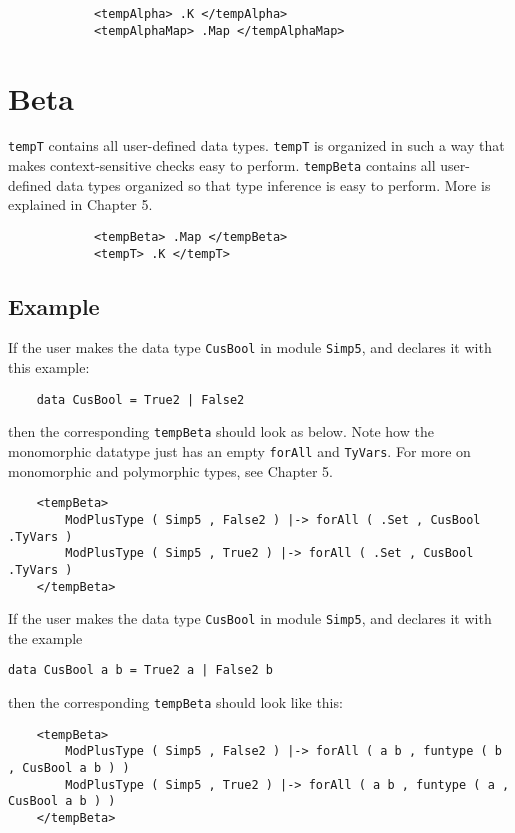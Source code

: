 \begin{lstlisting}
            <tempAlpha> .K </tempAlpha>
            <tempAlphaMap> .Map </tempAlphaMap>
\end{lstlisting}

\section{Beta}

\texttt{tempT} contains all user-defined data types. \texttt{tempT} is organized in such a way that makes context-sensitive checks easy to perform. \texttt{tempBeta} contains all user-defined data types organized so that type inference is easy to perform. More is explained in Chapter 5.
\begin{lstlisting}
            <tempBeta> .Map </tempBeta>
            <tempT> .K </tempT>
\end{lstlisting}

\subsection{Example}
If the user makes the data type \texttt{CusBool} in module \texttt{Simp5}, and declares it with this example:
\begin{lstlisting}
	data CusBool = True2 | False2
\end{lstlisting}

\noindent
then the corresponding \texttt{tempBeta} should look as below. Note how the monomorphic datatype just has an empty \texttt{forAll} and \texttt{TyVars}. For more on monomorphic and polymorphic types, see Chapter 5.

\begin{lstlisting}
    <tempBeta>
        ModPlusType ( Simp5 , False2 ) |-> forAll ( .Set , CusBool .TyVars )
        ModPlusType ( Simp5 , True2 ) |-> forAll ( .Set , CusBool .TyVars )
    </tempBeta>
\end{lstlisting}

If the user makes the data type \texttt{CusBool} in module \texttt{Simp5}, and declares it with the example
\begin{lstlisting}
data CusBool a b = True2 a | False2 b
\end{lstlisting}

\noindent
then the corresponding \texttt{tempBeta} should look like this:
\begin{lstlisting}
    <tempBeta>
        ModPlusType ( Simp5 , False2 ) |-> forAll ( a b , funtype ( b , CusBool a b ) )
        ModPlusType ( Simp5 , True2 ) |-> forAll ( a b , funtype ( a , CusBool a b ) )
    </tempBeta>

\end{lstlisting}

